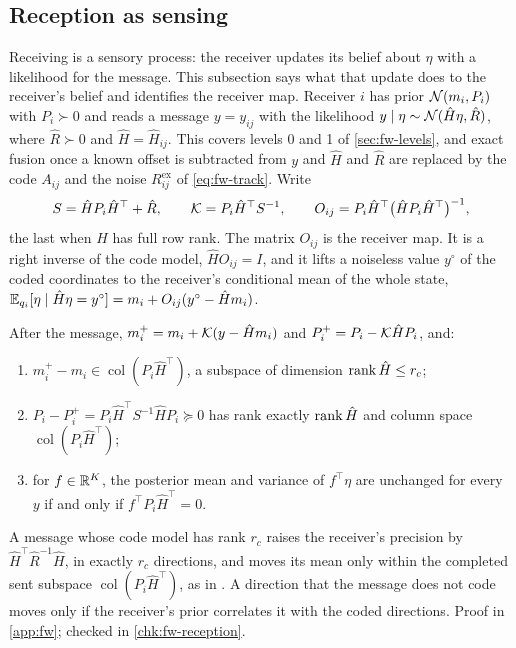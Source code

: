 \subsection{Reception as sensing}\label{sec:fw-reception}

Receiving is a sensory process: the receiver updates its belief about $\eta$ with a likelihood for the message. This subsection says what that update does to the receiver's belief and identifies the receiver map. Receiver $i$ has prior $\mathcal{N}(m_i,P_i)$ with $P_i\succ0$ and reads a message $y=y_{ij}$ with the likelihood $y\mid\eta\sim\mathcal{N}(\hat H\eta,\hat R)$, where $\hat R\succ0$ and $\hat H=\hat H_{ij}$. This covers levels 0 and 1 of \cref{sec:fw-levels}, and exact fusion once a known offset is subtracted from $y$ and $\hat H$ and $\hat R$ are replaced by the code $A_{ij}$ and the noise $R^{\mathrm{ex}}_{ij}$ of \eqref{eq:fw-track}. Write
\begin{equation}\label{eq:fw-gain}
S=\hat HP_i\hat H^\top+\hat R,\qquad\mathcal{K}=P_i\hat H^\top S^{-1},\qquad O_{ij}=P_i\hat H^\top\bigl(\hat HP_i\hat H^\top\bigr)^{-1},
\end{equation}
the last when $\hat H$ has full row rank. The matrix $O_{ij}$ is the receiver map. It is a right inverse of the code model, $\hat HO_{ij}=I$, and it lifts a noiseless value $y^\circ$ of the coded coordinates to the receiver's conditional mean of the whole state, $\mathbb{E}_{q_i}[\eta\mid\hat H\eta=y^\circ]=m_i+O_{ij}(y^\circ-\hat Hm_i)$.

\begin{proposition}\label{prop:fw-update-subspace}
After the message, $m_i^+=m_i+\mathcal{K}(y-\hat Hm_i)$ and $P_i^+=P_i-\mathcal{K}\hat HP_i$, and:
\begin{enumerate}
\item[(a)] $m_i^+-m_i\in\operatorname{col}(P_i\hat H^\top)$, a subspace of dimension $\operatorname{rank}\hat H\le r_c$;
\item[(b)] $P_i-P_i^+=P_i\hat H^\top S^{-1}\hat HP_i\succeq0$ has rank exactly $\operatorname{rank}\hat H$ and column space $\operatorname{col}(P_i\hat H^\top)$;
\item[(c)] for $f\in\mathbb{R}^K$, the posterior mean and variance of $f^\top\eta$ are unchanged for every $y$ if and only if $f^\top P_i\hat H^\top=0$.
\end{enumerate}
\end{proposition}

A message whose code model has rank $r_c$ raises the receiver's precision by $\hat H^\top\hat R^{-1}\hat H$, in exactly $r_c$ directions, and moves its mean only within the completed sent subspace $\operatorname{col}(P_i\hat H^\top)$, as in \citet{dennis2026magent}. A direction that the message does not code moves only if the receiver's prior correlates it with the coded directions. Proof in \cref{app:fw}; checked in \cref{chk:fw-reception}.

